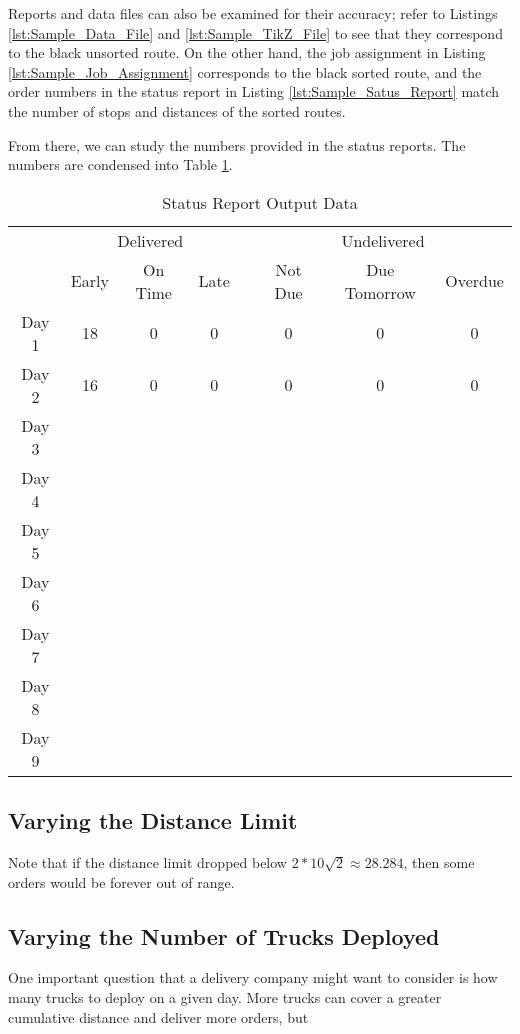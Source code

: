 \documentclass[letterpaper]{article}
\begin{document}
    Reports and data files can also be examined for their accuracy; refer to Listings \ref{lst:Sample_Data_File} and \ref{lst:Sample_TikZ_File} to see that they correspond to the black unsorted route. On the other hand, the job assignment in Listing \ref{lst:Sample_Job_Assignment} corresponds to the black sorted route, and the order numbers in the status report in Listing \ref{lst:Sample_Satus_Report} match the number of stops and distances of the sorted routes.

    From there, we can study the numbers provided in the status reports. The numbers are condensed into Table \ref{table:deliverystats}.

    \begin{table}[h]
        \centering
        \caption{Status Report Output Data}
        \label{table:deliverystats}
        \begin{tabular}{cccccccc}
            & \multicolumn{3}{c}{Delivered} && \multicolumn{3}{c}{Undelivered} \\
            & Early & On Time & Late && Not Due & Due Tomorrow & Overdue \\
            \cline{2-4} \cline{6-8}
            Day 1 & 18 & 0 & 0 && 0 & 0 & 0 \\
            Day 2 & 16 & 0 & 0 && 0 & 0 & 0 \\
            Day 3 &  &  &  &&  &  &  \\
            Day 4 &  &  &  &&  &  &  \\
            Day 5 &  &  &  &&  &  &  \\
            Day 6 &  &  &  &&  &  &  \\
            Day 7 &  &  &  &&  &  &  \\
            Day 8 &  &  &  &&  &  &  \\
            Day 9 &  &  &  &&  &  &  \\
        \end{tabular}
    \end{table}

    \subsection{Varying the Distance Limit}
    \label{}
    Note that if the distance limit dropped below $2 * 10 \sqrt{2} \approx 28.284$, then some orders would be forever out of range.

    \subsection{Varying the Number of Trucks Deployed}
    \label{subsection:Investigating_the_Number_of_Trucks_Deployed}
    One important question that a delivery company might want to consider is how many trucks to deploy on a given day. More trucks can cover a greater cumulative distance and deliver more orders, but 
\end{document}
